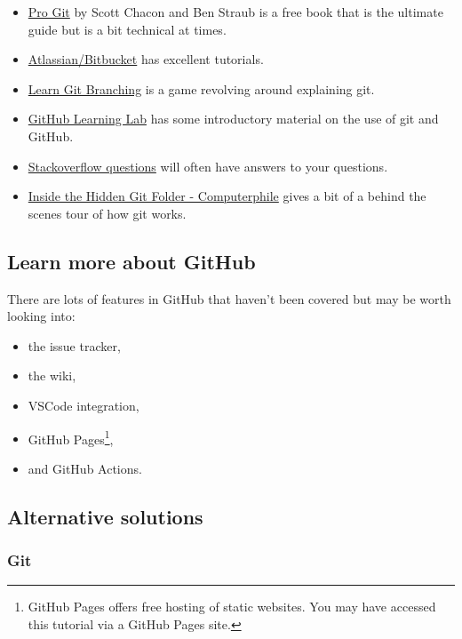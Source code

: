 \documentclass[11pt,onecolumn]{scrartcl}
\begin{document}
\begin{itemize}
\item \href{https://git-scm.com/book/en/v2}{Pro Git} by Scott Chacon and Ben Straub is a free book that is the ultimate
guide but is a bit technical at times.
\item \href{https://www.atlassian.com/git/tutorials}{Atlassian/Bitbucket} has excellent tutorials.
\item \href{https://learngitbranching.js.org/}{Learn Git Branching} is a game revolving around explaining git.
\item \href{https://lab.github.com/}{GitHub Learning Lab} has some introductory material on the use of git and
GitHub.
\item \href{https://stackoverflow.com/questions/tagged/git}{Stackoverflow questions} will often have answers to your questions.
\item \href{https://youtu.be/bSA91XTzeuA}{Inside the Hidden Git Folder - Computerphile} gives a bit of a behind the
scenes tour of how git works.
\end{itemize}

\subsection{Learn more about GitHub}
\label{sec:orgafdada1}

There are lots of features in GitHub that haven't been covered but may be worth
looking into:

\begin{itemize}
\item the issue tracker,
\item the wiki,
\item VSCode integration,
\item GitHub Pages\footnote{GitHub Pages offers free hosting of static websites. You may have accessed this tutorial via a GitHub Pages site.},
\item and GitHub Actions.
\end{itemize}

\subsection{Alternative solutions}
\label{sec:org7adac0d}

\subsubsection*{Git}
\label{sec:org777b0f8}
\end{document}
